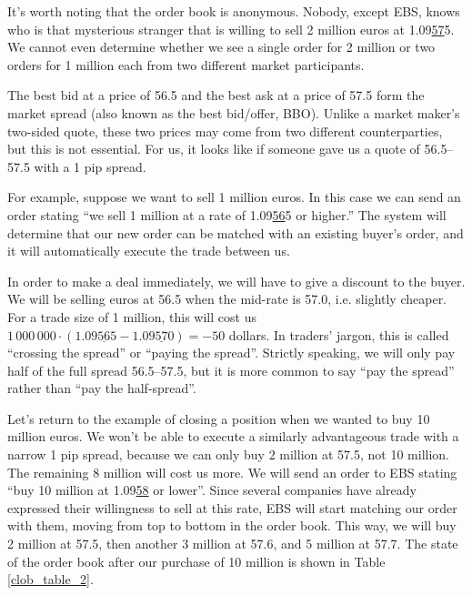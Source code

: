 \documentclass[a4paper,14pt]{extarticle}
\begin{document}
It's worth noting that the order book is anonymous. Nobody, except EBS, knows 
who is that mysterious stranger that is willing to sell 2 million 
euros at 1.09\underline{57}5. We cannot even determine whether we see a single 
order for 2 million or two orders for 1 million each from two different market 
participants.

The best bid at a price of 56.5 and the best ask at a price of 57.5 form the 
market spread (also known as the best bid/offer, BBO). Unlike a market maker's 
two-sided quote, these two prices may come from two different counterparties, 
but this is not essential. For us, it looks like if someone gave us a quote of 
56.5--57.5 with a 1 pip spread.

For example, suppose we want to sell 1 million euros. In this case we can send 
an order stating ``we sell 1 million at a rate of 1.09\underline{56}5 or 
higher.'' The system will determine that our new order can be matched with an 
existing buyer's order, and it will automatically execute the trade between us.

In order to make a deal immediately, we will have to give a discount to the 
buyer. We will be selling euros at 56.5 when the mid-rate is 57.0, i.e. 
slightly cheaper. For a trade size of 1 million, this will cost us $1\,000\,
000\cdot(1.09\underline{56}5 - 1.09\underline{57}0) = -50$ dollars. In traders' 
jargon, this is called ``crossing the spread'' or ``paying the spread''. 
Strictly speaking, we will only pay half of the full spread 56.5--57.5, but it 
is more common to say ``pay the spread'' rather than ``pay the half-spread''.

Let's return to the example of closing a position when we wanted to buy 10 
million euros. We won't be able to execute a similarly advantageous trade with a 
narrow 1 pip spread, because we can only buy 2 million at 57.5, not 10 million. 
The remaining 8 million will cost us more. We will send an order to EBS stating 
``buy 10 million at 1.09\underline{58} or lower''. Since several companies have 
already expressed their willingness to sell at this rate, EBS will start 
matching our order with them, moving from top to bottom in the order book. This 
way, we will buy 2 million at 57.5, then another 3 million at 57.6, and 5 
million at 57.7. The state of the order book after our purchase of 10 million is 
shown in Table \ref{clob_table_2}.
\end{document}
